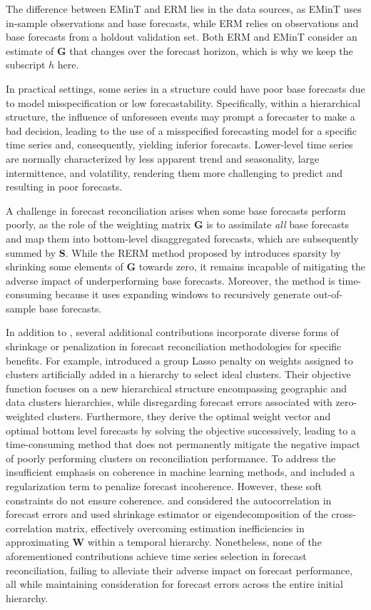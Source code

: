 \documentclass[
  11pt]{article}
\begin{document}
The difference between EMinT and ERM lies in the data sources, as EMinT
uses in-sample observations and base forecasts, while ERM relies on
observations and base forecasts from a holdout validation set. Both ERM
and EMinT consider an estimate of \(\bm{G}\) that changes over the
forecast horizon, which is why we keep the subscript \(h\) here.

In practical settings, some series in a structure could have poor base
forecasts due to model misspecification or low forecastability.
Specifically, within a hierarchical structure, the influence of
unforeseen events may prompt a forecaster to make a bad decision,
leading to the use of a misspecified forecasting model for a specific
time series and, consequently, yielding inferior forecasts. Lower-level
time series are normally characterized by less apparent trend and
seasonality, large intermittence, and volatility, rendering them more
challenging to predict and resulting in poor forecasts.

A challenge in forecast reconciliation arises when some base forecasts
perform poorly, as the role of the weighting matrix \(\bm{G}\) is to
assimilate \emph{all} base forecasts and map them into bottom-level
disaggregated forecasts, which are subsequently summed by \(\bm{S}\).
While the RERM method proposed by \citet{Ben_Taieb2019-be} introduces
sparsity by shrinking some elements of \(\bm{G}\) towards zero, it
remains incapable of mitigating the adverse impact of underperforming
base forecasts. Moreover, the method is time-consuming because it uses
expanding windows to recursively generate out-of-sample base forecasts.

In addition to \citet{Ben_Taieb2019-be}, several additional
contributions incorporate diverse forms of shrinkage or penalization in
forecast reconciliation methodologies for specific benefits. For
example, \citet{Pang2022-hi} introduced a group Lasso penalty on weights
assigned to clusters artificially added in a hierarchy to select ideal
clusters. Their objective function focuses on a new hierarchical
structure encompassing geographic and data clusters hierarchies, while
disregarding forecast errors associated with zero-weighted clusters.
Furthermore, they derive the optimal weight vector and optimal bottom
level forecasts by solving the objective successively, leading to a
time-consuming method that does not permanently mitigate the negative
impact of poorly performing clusters on reconciliation performance. To
address the insufficient emphasis on coherence in machine learning
methods, \citet{Mishchenko2019-as} and \citet{Gleason2020-fo} included a
regularization term to penalize forecast incoherence. However, these
soft constraints do not ensure coherence. \citet{Nystrup2020-te} and
\citet{Nystrup2021-di} considered the autocorrelation in forecast errors
and used shrinkage estimator or eigendecomposition of the
cross-correlation matrix, effectively overcoming estimation
inefficiencies in approximating \(\bm{W}\) within a temporal hierarchy.
Nonetheless, none of the aforementioned contributions achieve time
series selection in forecast reconciliation, failing to alleviate their
adverse impact on forecast performance, all while maintaining
consideration for forecast errors across the entire initial hierarchy.
\end{document}
